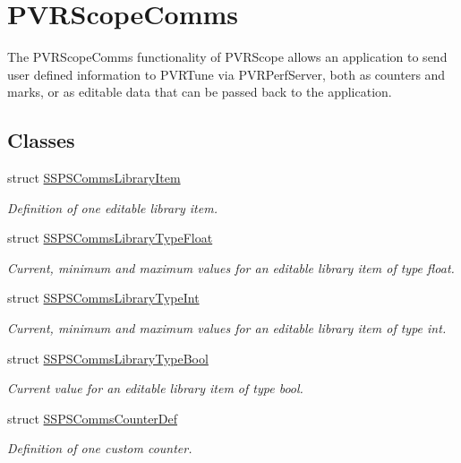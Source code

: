 \hypertarget{group___scope_comms}{\section{P\+V\+R\+Scope\+Comms}
\label{group___scope_comms}
}


The P\+V\+R\+Scope\+Comms functionality of P\+V\+R\+Scope allows an application to send user defined information to P\+V\+R\+Tune via P\+V\+R\+Perf\+Server, both as counters and marks, or as editable data that can be passed back to the application.  


\subsection*{Classes}
\begin{DoxyCompactItemize}
\item 
struct \hyperlink{struct_s_s_p_s_comms_library_item}{S\+S\+P\+S\+Comms\+Library\+Item}
\begin{DoxyCompactList}\small\item\em Definition of one editable library item. \end{DoxyCompactList}\item 
struct \hyperlink{struct_s_s_p_s_comms_library_type_float}{S\+S\+P\+S\+Comms\+Library\+Type\+Float}
\begin{DoxyCompactList}\small\item\em Current, minimum and maximum values for an editable library item of type float. \end{DoxyCompactList}\item 
struct \hyperlink{struct_s_s_p_s_comms_library_type_int}{S\+S\+P\+S\+Comms\+Library\+Type\+Int}
\begin{DoxyCompactList}\small\item\em Current, minimum and maximum values for an editable library item of type int. \end{DoxyCompactList}\item 
struct \hyperlink{struct_s_s_p_s_comms_library_type_bool}{S\+S\+P\+S\+Comms\+Library\+Type\+Bool}
\begin{DoxyCompactList}\small\item\em Current value for an editable library item of type bool. \end{DoxyCompactList}\item 
struct \hyperlink{struct_s_s_p_s_comms_counter_def}{S\+S\+P\+S\+Comms\+Counter\+Def}
\begin{DoxyCompactList}\small\item\em Definition of one custom counter. \end{DoxyCompactList}\end{DoxyCompactItemize}
